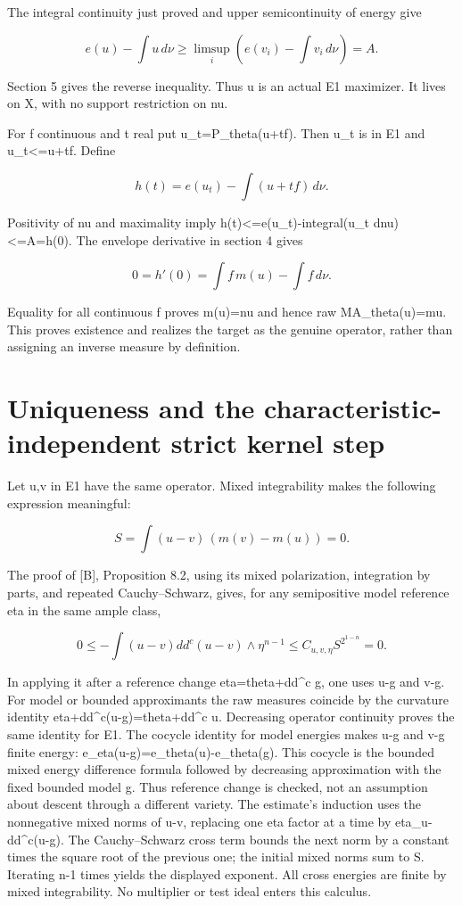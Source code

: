 \documentclass[11pt]{article}
\begin{document}
The integral continuity just proved and upper semicontinuity of energy give

\[
e(u)-\int u\,d\nu\geq
\limsup_i\left(e(v_i)-\int v_i\,d\nu\right)=A.
\]

Section 5 gives the reverse inequality. Thus u is an actual E1 maximizer. It lives on X, with no support restriction on nu.

For f continuous and t real put u\_t=P\_theta(u+tf). Then u\_t is in E1 and u\_t\textless{}=u+tf. Define

\[
h(t)=e(u_t)-\int(u+tf)\,d\nu.
\]

Positivity of nu and maximality imply h(t)\textless{}=e(u\_t)-integral(u\_t dnu)\textless{}=A=h(0). The envelope derivative in section 4 gives

\[
0=h'(0)=\int f\,m(u)-\int f\,d\nu.
\]

Equality for all continuous f proves m(u)=nu and hence raw MA\_theta(u)=mu. This proves existence and realizes the target as the genuine operator, rather than assigning an inverse measure by definition.

\section{Uniqueness and the characteristic-independent strict kernel step}

Let u,v in E1 have the same operator. Mixed integrability makes the following expression meaningful:

\[
S=\int(u-v)\,(m(v)-m(u))=0.
\]

The proof of [B], Proposition 8.2, using its mixed polarization, integration by parts, and repeated Cauchy--Schwarz, gives, for any semipositive model reference eta in the same ample class,

\[
0\leq-\int (u-v)dd^c(u-v)\wedge\eta^{n-1}
\leq C_{u,v,\eta}S^{2^{1-n}}=0.
\]

In applying it after a reference change eta=theta+dd\textasciicircum{}c g, one uses u-g and v-g. For model or bounded approximants the raw measures coincide by the curvature identity eta+dd\textasciicircum{}c(u-g)=theta+dd\textasciicircum{}c u. Decreasing operator continuity proves the same identity for E1. The cocycle identity for model energies makes u-g and v-g finite energy: e\_eta(u-g)=e\_theta(u)-e\_theta(g). This cocycle is the bounded mixed energy difference formula followed by decreasing approximation with the fixed bounded model g. Thus reference change is checked, not an assumption about descent through a different variety. The estimate's induction uses the nonnegative mixed norms of u-v, replacing one eta factor at a time by eta\_u-dd\textasciicircum{}c(u-g). The Cauchy--Schwarz cross term bounds the next norm by a constant times the square root of the previous one; the initial mixed norms sum to S. Iterating n-1 times yields the displayed exponent. All cross energies are finite by mixed integrability. No multiplier or test ideal enters this calculus.
\end{document}
